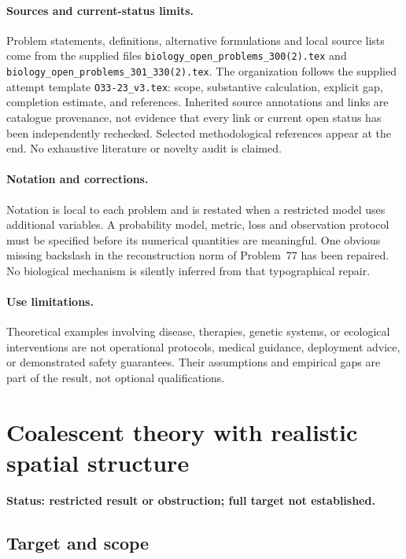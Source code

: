 \documentclass[11pt]{article}
\begin{document}
\paragraph{Sources and current-status limits.}
Problem statements, definitions, alternative formulations and local source lists
come from the supplied files
\texttt{biology\_open\_problems\_300(2).tex} and
\texttt{biology\_open\_problems\_301\_330(2).tex}.
The organization follows the supplied attempt template
\texttt{O33-23\_v3.tex}: scope, substantive calculation, explicit gap,
completion estimate, and references. Inherited source annotations and links are
catalogue provenance, not evidence that every link or current open status has
been independently rechecked. Selected methodological references appear at the
end. No exhaustive literature or novelty audit is claimed.

\paragraph{Notation and corrections.}
Notation is local to each problem and is restated when a restricted model uses
additional variables. A probability model, metric, loss and observation protocol
must be specified before its numerical quantities are meaningful. One obvious
missing backslash in the reconstruction norm of Problem~77 has been repaired.
No biological mechanism is silently inferred from that typographical repair.

\paragraph{Use limitations.}
Theoretical examples involving disease, therapies, genetic systems, or ecological
interventions are not operational protocols, medical guidance, deployment advice,
or demonstrated safety guarantees. Their assumptions and empirical gaps are part
of the result, not optional qualifications.


\section*{Coalescent theory with realistic spatial structure}
\label{prob:177}
\noindent\textbf{Status: restricted result or obstruction; full target not established.}
\subsection{Target and scope}
\end{document}
